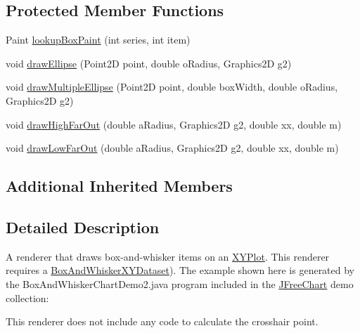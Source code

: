\subsection*{Protected Member Functions}
\begin{DoxyCompactItemize}
\item 
Paint \mbox{\hyperlink{classorg_1_1jfree_1_1chart_1_1renderer_1_1xy_1_1_x_y_box_and_whisker_renderer_a748c865cc3b8272d8fd802620dd78942}{lookup\+Box\+Paint}} (int series, int item)
\item 
void \mbox{\hyperlink{classorg_1_1jfree_1_1chart_1_1renderer_1_1xy_1_1_x_y_box_and_whisker_renderer_a7a2683e17df0eb0a447e11de4fb38c80}{draw\+Ellipse}} (Point2D point, double o\+Radius, Graphics2D g2)
\item 
void \mbox{\hyperlink{classorg_1_1jfree_1_1chart_1_1renderer_1_1xy_1_1_x_y_box_and_whisker_renderer_a34e925e2f4cb54fc08b7a05b3e4c6d3b}{draw\+Multiple\+Ellipse}} (Point2D point, double box\+Width, double o\+Radius, Graphics2D g2)
\item 
void \mbox{\hyperlink{classorg_1_1jfree_1_1chart_1_1renderer_1_1xy_1_1_x_y_box_and_whisker_renderer_a4c3e130d7472db9bbb24deef8526cc15}{draw\+High\+Far\+Out}} (double a\+Radius, Graphics2D g2, double xx, double m)
\item 
void \mbox{\hyperlink{classorg_1_1jfree_1_1chart_1_1renderer_1_1xy_1_1_x_y_box_and_whisker_renderer_a34e33b960c3b3368d2aaf4e89ab813bb}{draw\+Low\+Far\+Out}} (double a\+Radius, Graphics2D g2, double xx, double m)
\end{DoxyCompactItemize}
\subsection*{Additional Inherited Members}


\subsection{Detailed Description}
A renderer that draws box-\/and-\/whisker items on an \mbox{\hyperlink{}{X\+Y\+Plot}}. This renderer requires a \mbox{\hyperlink{}{Box\+And\+Whisker\+X\+Y\+Dataset}}). The example shown here is generated by the {\ttfamily Box\+And\+Whisker\+Chart\+Demo2.\+java} program included in the \mbox{\hyperlink{classorg_1_1jfree_1_1chart_1_1_j_free_chart}{J\+Free\+Chart}} demo collection\+: ~\newline
~\newline
  

This renderer does not include any code to calculate the crosshair point. 

